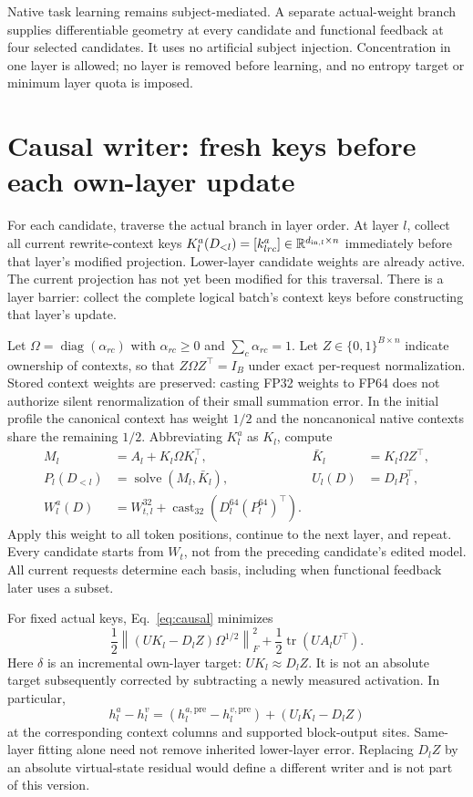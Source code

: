 \documentclass[10pt]{article}
\newcommand{\tr}{\operatorname{tr}}
\newcommand{\norm}[1]{\left\lVert#1\right\rVert}
\newcommand{\RR}{\mathbb R}
\begin{document}
Native task learning remains subject-mediated. A separate actual-weight
branch supplies differentiable geometry at every candidate and functional
feedback at four selected candidates. It uses no artificial subject
injection. Concentration in one layer is allowed; no layer is removed
before learning, and no entropy target or minimum layer quota is imposed.

\newpage
\section{Causal writer: fresh keys before each own-layer update}
For each candidate, traverse the actual branch in layer order. At layer
$l$, collect all current rewrite-context keys
$K_l^a(D_{<l})=[k^a_{lrc}]\in\RR^{d_{{\rm in},l}\times n}$ immediately
before that layer's modified projection. Lower-layer candidate weights
are already active. The current projection has not yet been modified for
this traversal. There is a layer barrier: collect the complete logical
batch's context keys before constructing that layer's update.

Let $\Omega=\operatorname{diag}(\alpha_{rc})$ with
$\alpha_{rc}\geq0$ and $\sum_c\alpha_{rc}=1$. Let
$Z\in\{0,1\}^{B\times n}$ indicate ownership of contexts, so that
$Z\Omega Z^\top=I_B$ under exact per-request normalization. Stored context
weights are preserved: casting FP32 weights to FP64 does not authorize
silent renormalization of their small summation error. In the initial
profile the canonical context has
weight $1/2$ and the noncanonical native contexts share the remaining
$1/2$. Abbreviating $K_l^a$ as $K_l$, compute
\begin{align}
 M_l&=A_l+K_l\Omega K_l^\top, &
 \bar K_l&=K_l\Omega Z^\top,\\
 P_l(D_{<l})&=\operatorname{solve}(M_l,\bar K_l), &
 U_l(D)&=D_lP_l^\top,\\
 W^a_l(D)&=W_{t,l}^{32}
       +\operatorname{cast}_{32}\!\left(D_l^{64}(P_l^{64})^\top\right).
 \label{eq:causal}
\end{align}
Apply this weight to all token positions, continue to the next layer,
and repeat. Every candidate starts from $W_t$, not from the preceding
candidate's edited model. All current requests determine each basis,
including when functional feedback later uses a subset.

For fixed actual keys, Eq.~\eqref{eq:causal} minimizes
\[
 \frac12\norm{(UK_l-D_lZ)\Omega^{1/2}}_F^2
 +\frac12\tr(UA_lU^\top).
\]
Here $\delta$ is an incremental own-layer target: $UK_l\approx D_lZ$.
It is not an absolute target subsequently corrected by subtracting a
newly measured activation. In particular,
\[
 h^a_l-h^v_l=(h^{a,\mathrm{pre}}_l-h^{v,\mathrm{pre}}_l)
              +(U_lK_l-D_lZ)
\]
at the corresponding context columns and supported block-output sites.
Same-layer fitting alone need not remove inherited lower-layer error.
Replacing $D_lZ$ by an absolute virtual-state residual would define a
different writer and is not part of this version.
\end{document}
